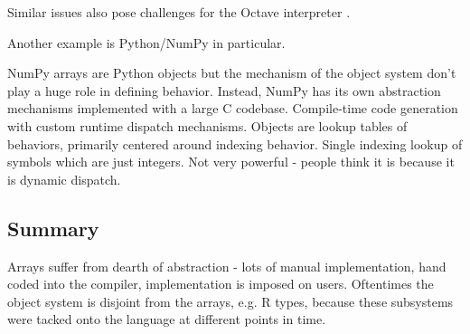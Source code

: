 \documentclass[preprint]{sigplanconf}
\newcommand{\Mathematica}{\textit{Mathematica}}
\newcommand{\code}[1]{\texttt{#1}}
\begin{document}
\begin{enumerate}

 Similar issues also pose challenges for the Octave interpreter \cite{Eaton:2001op}.

%

Another example is Python/NumPy in particular.

NumPy arrays are Python objects but the mechanism of the object system don't
play a huge role in defining behavior. Instead, NumPy has its own abstraction
mechanisms implemented with a large C codebase. Compile-time code generation
with custom runtime dispatch mechanisms. Objects are lookup tables of
behaviors, primarily centered around indexing behavior. Single indexing lookup
of symbols which are just integers. Not very powerful - people think it is
because it is dynamic dispatch.


\end{enumerate}

\subsection{Summary}

Arrays suffer from dearth of abstraction - lots of manual implementation, hand
coded into the compiler, implementation is imposed on users. Oftentimes the
object system is disjoint from the arrays, e.g. R types, because these
subsystems were tacked onto the language at different points in time.
\end{document}

